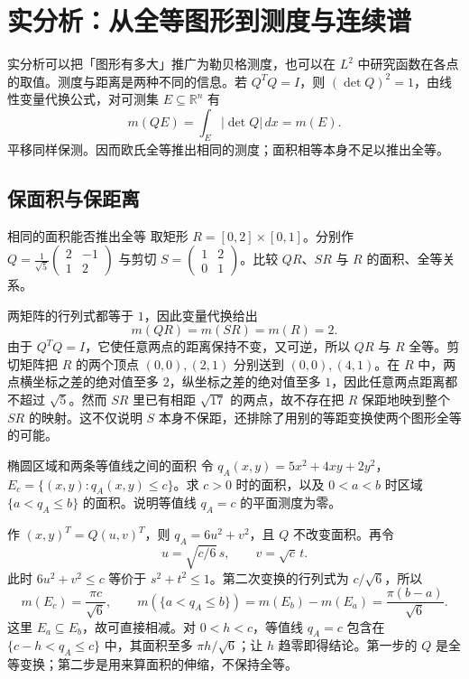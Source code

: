 \chapter{实分析：从全等图形到测度与连续谱}
\label{chap:real-analysis}

实分析可以把「图形有多大」推广为勒贝格测度，也可以在 \(L^2\) 中研究函数在各点的取值。测度与距离是两种不同的信息。若 \(Q^TQ=I\)，则 \((\det Q)^2=1\)，由线性变量代换公式，对可测集 \(E\subseteq\mathbb R^n\) 有
\[
 m(QE)=\int_E |\det Q|\,dx=m(E).
\]
平移同样保测。因而欧氏全等推出相同的测度；面积相等本身不足以推出全等。

\section{保面积与保距离}

\begin{example}{相同的面积能否推出全等}
取矩形 \(R=[0,2]\times[0,1]\)。分别作 \(Q=\frac1{\sqrt5}\begin{pmatrix}2&-1\\1&2\end{pmatrix}\) 与剪切 \(S=\begin{pmatrix}1&2\\0&1\end{pmatrix}\)。比较 \(QR\)、\(SR\) 与 \(R\) 的面积、全等关系。
\end{example}
\begin{solution}
两矩阵的行列式都等于 \(1\)，因此变量代换给出
\[
 m(QR)=m(SR)=m(R)=2.
\]
由于 \(Q^TQ=I\)，它使任意两点的距离保持不变，又可逆，所以 \(QR\) 与 \(R\) 全等。剪切矩阵把 \(R\) 的两个顶点 \((0,0),(2,1)\) 分别送到 \((0,0),(4,1)\)。在 \(R\) 中，两点横坐标之差的绝对值至多 \(2\)，纵坐标之差的绝对值至多 \(1\)，因此任意两点距离都不超过 \(\sqrt5\)。然而 \(SR\) 里已有相距 \(\sqrt{17}\) 的两点，故不存在把 \(R\) 保距地映到整个 \(SR\) 的映射。这不仅说明 \(S\) 本身不保距，还排除了用别的等距变换使两个图形全等的可能。
\end{solution}

\begin{example}{椭圆区域和两条等值线之间的面积}
令 \(q_A(x,y)=5x^2+4xy+2y^2\)，\(E_c=\{(x,y):q_A(x,y)\leq c\}\)。求 \(c>0\) 时的面积，以及 \(0<a<b\) 时区域 \(\{a<q_A\leq b\}\) 的面积。说明等值线 \(q_A=c\) 的平面测度为零。
\end{example}
\begin{solution}
作 \((x,y)^T=Q(u,v)^T\)，则 \(q_A=6u^2+v^2\)，且 \(Q\) 不改变面积。再令
\[
 u=\sqrt{c/6}\,s,\qquad v=\sqrt c\,t.
\]
此时 \(6u^2+v^2\leq c\) 等价于 \(s^2+t^2\leq1\)。第二次变换的行列式为 \(c/\sqrt6\)，所以
\[
 m(E_c)=\frac{\pi c}{\sqrt6},\qquad
 m(\{a<q_A\leq b\})=m(E_b)-m(E_a)=\frac{\pi(b-a)}{\sqrt6}.
\]
这里 \(E_a\subseteq E_b\)，故可直接相减。对 \(0<h<c\)，等值线 \(q_A=c\) 包含在 \(\{c-h<q_A\leq c\}\) 中，其面积至多 \(\pi h/\sqrt6\)；让 \(h\) 趋零即得结论。第一步的 \(Q\) 是全等变换；第二步是用来算面积的伸缩，不保持全等。
\end{solution}

